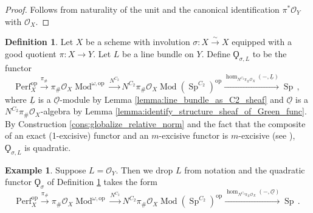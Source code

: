 \documentclass{article}
\DeclareMathOperator{\Mod}{Mod} %
\DeclareMathOperator{\Spectra}{Sp} %
\newcommand{\op}{\mathrm{op}} %
\newcommand{\perf}{\mathrm{Perf}}
\newtheorem{lemma}[equation]{Lemma}
\theoremstyle{definition}
\newtheorem{definition}[equation]{Definition}
\newtheorem{example}[equation]{Example}
\newcommand{\Lucy}[1]{\todo[color=cyan!30]{\linespread{1}\footnotesize L: #1}}
\begin{document}
\begin{proof}
    Follows from naturality of the unit and the canonical identification $ \pi^* \mathcal{O}_Y $ with $ \mathcal{O}_X $. 
\end{proof}
\begin{definition}\label{defn:quadratic_functor_from_good_quotient}
    Let $ X $ be a scheme with involution $ \sigma \colon X \xrightarrow{\sim} X $ equipped with a good quotient $ \pi \colon X \to Y $. 
    Let $ L $ be a line bundle on $ Y $. 
    Define $ \Qoppa_{\sigma, L} $ to be the functor
    \begin{equation*}
        \perf_X^\op \xrightarrow{\pi_{\#}} \pi_{\#}\mathcal{O}_X\Mod^{\omega,\op} \xrightarrow{N^{C_2}} N^{C_2}\pi_{\#}\mathcal{O}_X\Mod\left(\Spectra^{C_2}\right)^\op \xrightarrow{\hom_{N^{C_2}\pi_{\#}\mathcal{O}_X}(-,\underline{L})} \Spectra \,,
    \end{equation*}
    where $ \underline{L} $ is a $ \underline{\mathcal{O}} $-module by Lemma \ref{lemma:line_bundle_as_C2_sheaf} and $ \underline{\mathcal{O}} $ is a $ N^{C_2} \pi_{\#}\mathcal{O}_X $-algebra by Lemma \ref{lemma:identify_structure_sheaf_of_Green_func}. 
    By Construction \ref{cons:globalize_relative_norm} and the fact that the composite of an exact (1-excisive) functor and an $ m$-excisive functor is $m$-excisive (see \cite[\S2.2]{Kpoly}), $ \Qoppa_{\sigma,L} $ is quadratic. 
\end{definition}
\begin{example} 
    Suppose $ L = \mathcal{O}_Y $. 
    Then we drop $ L $ from notation and the quadratic functor $ \Qoppa_{\sigma} $ of Definition \ref{defn:quadratic_functor_from_good_quotient} takes the form
    \begin{equation*}
        \perf_X^\op \xrightarrow{\pi_{\#}} \pi_{\#}\mathcal{O}_X\Mod^{\omega,\op} \xrightarrow{N^{C_2}} N^{C_2}\pi_{\#}\mathcal{O}_X\Mod\left(\Spectra^{C_2}\right)^\op \xrightarrow{\hom_{N^{C_2}\pi_{\#}\mathcal{O}_X}(-,\underline{\mathcal{O}})} \Spectra \,.
    \end{equation*}    
\end{example}
\end{document}
